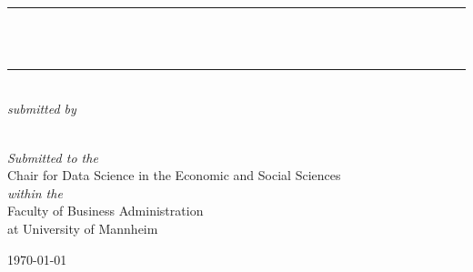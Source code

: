 %
%
%
% 
%


\begin{titlepage} %
\newcommand{\HRule}{\rule{\linewidth}{0.5mm}} %
\center %
\textsc{\LARGE \TypeofThesis}\\[1.5cm] %
\HRule\\[0.4cm]
{\huge\bfseries \TitleofThesis}\\[0.4cm] %
\HRule\\[1.5cm]
    \vfill
    \textit{\large submitted by}\\[0.5cm] %
\textsc{\Large \AuthorofThesis}\\[0.5cm] %
    \vfill

{\large\textit{Submitted to the}}\\
\Large Chair for Data Science in the Economic and Social Sciences \\
    {\large\textit{within the}}\\
    Faculty of Business Administration \\
    at University of Mannheim 
    
\vfill\vfill\vfill %
{\large\today} %


\end{titlepage}
